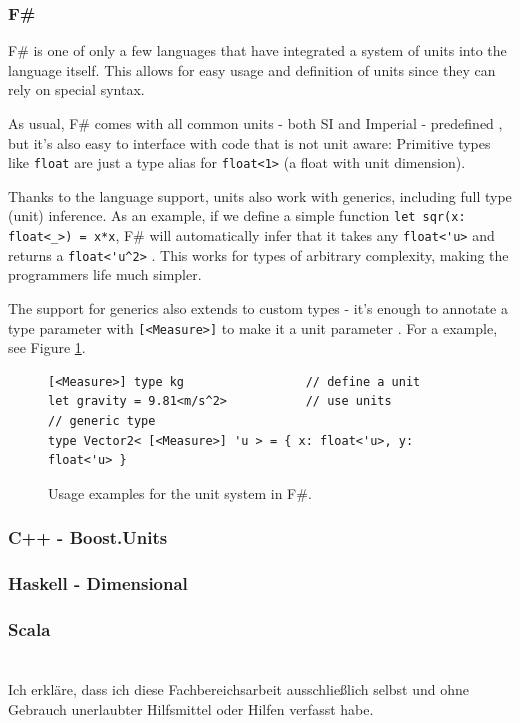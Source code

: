 \documentclass[12pt,oneside,a4paper]{scrbook}
\theoremstyle{definition}
\begin{document}
\subsection{F\#}

F\# is one of only a few languages that have integrated a system of units into the language itself. This allows for easy usage and definition of units since they can rely on special syntax.
\citep{Kennedy08:1}

As usual, F\# comes with all common units - both SI and Imperial - predefined \citep{Kennedy08:2}, but it's also easy to interface with code that is not unit aware: Primitive types like \verb/float/ are just a type alias for \verb/float<1>/ (a float with unit dimension).

Thanks to the language support, units also work with generics, including full type (unit) inference. As an example, if we define a simple function \verb/let sqr(x: float<_>) = x*x/, F\# will automatically infer that it takes any \verb/float<'u>/ and returns a \verb/float<'u^2>/ \citep{Kennedy08:3}. This works for types of arbitrary complexity, making the programmers life much simpler.

The support for generics also extends to custom types - it's enough to annotate a type parameter with \verb/[<Measure>]/ to make it a unit parameter \citep{Kennedy08:4}. For a example, see Figure \ref{code:fsharp}.


\begin{figure}
\begin{verbatim}
[<Measure>] type kg                 // define a unit
let gravity = 9.81<m/s^2>           // use units
// generic type
type Vector2< [<Measure>] 'u > = { x: float<'u>, y: float<'u> }
\end{verbatim}
\caption{Usage examples for the unit system in F\#.}
\label{code:fsharp}
\end{figure}

\subsection{C++ - Boost.Units}
\citep{Schabel10}

\subsection{Haskell - Dimensional}
\citep{Buckwalter06}

\subsection{Scala}
\citep{Hans12}
\citep{Nygard09}
\citep{McBeath08}

\singlespacing

{}

\chapter*{}
\onehalfspacing
Ich erkläre, dass ich diese Fachbereichsarbeit ausschließlich selbst und ohne Gebrauch unerlaubter Hilfsmittel oder Hilfen verfasst habe.
\end{document}
